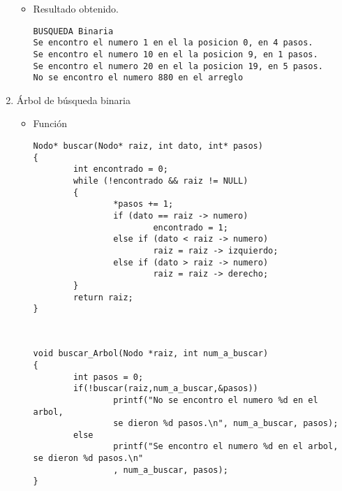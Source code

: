 \documentclass[a4paper,12pt]{article}
\begin{document}
\begin{enumerate}
\begin{itemize}
\item Resultado obtenido.

\begin{lstlisting}
BUSQUEDA Binaria
Se encontro el numero 1 en el la posicion 0, en 4 pasos.
Se encontro el numero 10 en el la posicion 9, en 1 pasos.
Se encontro el numero 20 en el la posicion 19, en 5 pasos.
No se encontro el numero 880 en el arreglo
\end{lstlisting}

\end{itemize}
\item Árbol de búsqueda binaria

\begin{itemize}
\item Función 

\begin{lstlisting}
Nodo* buscar(Nodo* raiz, int dato, int* pasos)
{
        int encontrado = 0;
        while (!encontrado && raiz != NULL)
        {
                *pasos += 1;
                if (dato == raiz -> numero)
                        encontrado = 1;
                else if (dato < raiz -> numero)
                        raiz = raiz -> izquierdo;
                else if (dato > raiz -> numero)
                        raiz = raiz -> derecho;
        }
        return raiz;
}
\end{lstlisting}

\lstset{basicstyle=\tiny}
\begin{lstlisting}


void buscar_Arbol(Nodo *raiz, int num_a_buscar)
{
        int pasos = 0;
        if(!buscar(raiz,num_a_buscar,&pasos))
                printf("No se encontro el numero %d en el arbol, 
                se dieron %d pasos.\n", num_a_buscar, pasos);
        else
                printf("Se encontro el numero %d en el arbol, se dieron %d pasos.\n"
                , num_a_buscar, pasos);
}

\end{lstlisting}


\end{itemize}

\end{enumerate}
\end{document}
